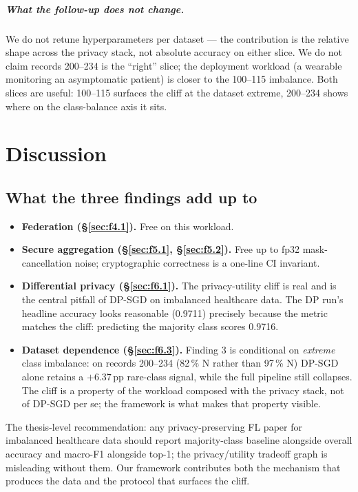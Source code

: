\documentclass[11pt,a4paper]{report}
\begin{document}
\paragraph{What the follow-up does not change.}
We do not retune hyperparameters per dataset --- the contribution is
the relative shape across the privacy stack, not absolute accuracy on
either slice. We do not claim records 200--234 is the ``right'' slice;
the deployment workload (a wearable monitoring an asymptomatic
patient) is closer to the 100--115 imbalance. Both slices are useful:
100--115 surfaces the cliff at the dataset extreme, 200--234 shows
where on the class-balance axis it sits.

\chapter{Discussion}\label{ch:disc}

\section{What the three findings add up to}

\begin{itemize}[leftmargin=*]
  \item \textbf{Federation (\S\ref{sec:f4.1}).} Free on this workload.
  \item \textbf{Secure aggregation (\S\ref{sec:f5.1}, \S\ref{sec:f5.2}).}
  Free up to fp32 mask-cancellation noise; cryptographic correctness is
  a one-line CI invariant.
  \item \textbf{Differential privacy (\S\ref{sec:f6.1}).} The
  privacy-utility cliff is real and is the central pitfall of DP-SGD on
  imbalanced healthcare data. The DP run's headline accuracy looks
  reasonable (0.9711) precisely because the metric matches the cliff:
  predicting the majority class scores 0.9716.
  \item \textbf{Dataset dependence (\S\ref{sec:f6.3}).} Finding 3 is
  conditional on \emph{extreme} class imbalance: on records 200--234
  (82\,\% N rather than 97\,\% N) DP-SGD alone retains a $+6.37$\,pp
  rare-class signal, while the full pipeline still collapses. The
  cliff is a property of the workload composed with the privacy stack,
  not of DP-SGD per se; the framework is what makes that property
  visible.
\end{itemize}

The thesis-level recommendation: any privacy-preserving FL paper for
imbalanced healthcare data should report majority-class baseline alongside
overall accuracy and macro-F1 alongside top-1; the privacy/utility tradeoff
graph is misleading without them. Our framework contributes both the
mechanism that produces the data and the protocol that surfaces the cliff.
\end{document}
